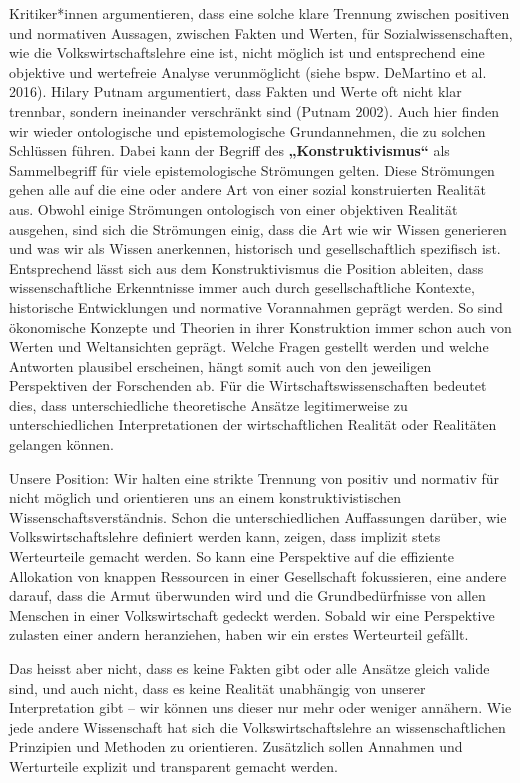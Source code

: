 \documentclass[
  nswissgerman,
  a4paper,
  DIV=11,
  numbers=noendperiod,
  oneside,
  openany]{scrreprt}
\begin{document}
Kritiker*innen argumentieren, dass eine solche klare Trennung zwischen
positiven und normativen Aussagen, zwischen Fakten und Werten, für
Sozialwissenschaften, wie die Volkswirtschaftslehre eine ist, nicht
möglich ist und entsprechend eine objektive und wertefreie Analyse
verunmöglicht (siehe bspw. DeMartino et al. 2016). Hilary Putnam
argumentiert, dass Fakten und Werte oft nicht klar trennbar, sondern
ineinander verschränkt sind (Putnam 2002). Auch hier finden wir wieder
ontologische und epistemologische Grundannehmen, die zu solchen
Schlüssen führen. Dabei kann der Begriff des
\textbf{„Konstruktivismus``} als Sammelbegriff für viele
epistemologische Strömungen gelten. Diese Strömungen gehen alle auf die
eine oder andere Art von einer sozial konstruierten Realität aus. Obwohl
einige Strömungen ontologisch von einer objektiven Realität ausgehen,
sind sich die Strömungen einig, dass die Art wie wir Wissen generieren
und was wir als Wissen anerkennen, historisch und gesellschaftlich
spezifisch ist. Entsprechend lässt sich aus dem Konstruktivismus die
Position ableiten, dass wissenschaftliche Erkenntnisse immer auch durch
gesellschaftliche Kontexte, historische Entwicklungen und normative
Vorannahmen geprägt werden. So sind ökonomische Konzepte und Theorien in
ihrer Konstruktion immer schon auch von Werten und Weltansichten
geprägt. Welche Fragen gestellt werden und welche Antworten plausibel
erscheinen, hängt somit auch von den jeweiligen Perspektiven der
Forschenden ab. Für die Wirtschaftswissenschaften bedeutet dies, dass
unterschiedliche theoretische Ansätze legitimerweise zu
unterschiedlichen Interpretationen der wirtschaftlichen Realität oder
Realitäten gelangen können.

Unsere Position: Wir halten eine strikte Trennung von positiv und
normativ für nicht möglich und orientieren uns an einem
konstruktivistischen Wissenschaftsverständnis. Schon die
unterschiedlichen Auffassungen darüber, wie Volkswirtschaftslehre
definiert werden kann, zeigen, dass implizit stets Werteurteile gemacht
werden. So kann eine Perspektive auf die effiziente Allokation von
knappen Ressourcen in einer Gesellschaft fokussieren, eine andere
darauf, dass die Armut überwunden wird und die Grundbedürfnisse von
allen Menschen in einer Volkswirtschaft gedeckt werden. Sobald wir eine
Perspektive zulasten einer andern heranziehen, haben wir ein erstes
Werteurteil gefällt.

Das heisst aber nicht, dass es keine Fakten gibt oder alle Ansätze
gleich valide sind, und auch nicht, dass es keine Realität unabhängig
von unserer Interpretation gibt -- wir können uns dieser nur mehr oder
weniger annähern. Wie jede andere Wissenschaft hat sich die
Volkswirtschaftslehre an wissenschaftlichen Prinzipien und Methoden zu
orientieren. Zusätzlich sollen Annahmen und Werturteile explizit und
transparent gemacht werden.
\end{document}
